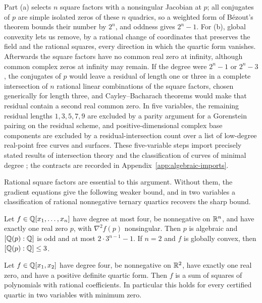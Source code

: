 Part (a) selects $n$ square factors with a nonsingular Jacobian at $p$; all
conjugates of $p$ are simple isolated zeros of these $n$ quadrics, so a
weighted form of B\'ezout's theorem bounds their number by $2^n$, and oddness
gives $2^n-1$. For (b), global convexity lets us remove, by a rational change
of coordinates that preserves the field and the rational squares, every
direction in which the quartic form vanishes. Afterwards the square factors
have no common real zero at infinity, although common complex zeros at
infinity may remain. If the degree were $2^n-1$ or $2^n-3$, the conjugates of
$p$ would leave a residual of length one or three in a complete intersection
of $n$ rational linear combinations of the square factors, chosen generically
for length three, and Cayley--Bacharach theorems
\cite{EisenbudGreenHarris1996} would make that residual contain a second real
common zero. In five variables, the remaining residual
lengths $1,3,5,7,9$ are excluded by a parity argument for a Gorenstein pairing
on the residual scheme, and positive-dimensional complex base components are
excluded by a residual-intersection count over a list of low-degree real-point
free curves and surfaces. These five-variable steps import precisely stated
results of intersection theory \cite{Fulton1998,EklundJostPeterson2013} and
the classification of curves of minimal degree \cite{EisenbudHarris1987}; the
contracts are recorded in Appendix~\ref{app:algebraic-imports}.

Rational square factors are essential to this argument. Without them, the
gradient equations give the following weaker bound, and in two variables a
classification of rational nonnegative ternary quartics recovers the sharp
bound.

\begin{proposition}
\label{prop:algebraic-node-bound}
Let $f\in\mathbb Q[x_1,\ldots,x_n]$ have degree at most four, be nonnegative on
$\mathbb R^n$, and have exactly one real zero $p$, with $\nabla^2f(p)$ nonsingular.
Then $p$ is algebraic and $[\mathbb Q(p):\mathbb Q]$ is odd and at most $2\cdot3^{n-1}-1$.
If $n=2$ and $f$ is globally convex, then $[\mathbb Q(p):\mathbb Q]\le3$.
\end{proposition}

\begin{lemma}
\label{lem:algebraic-bivariate-descent}
Let $f\in\mathbb Q[x_1,x_2]$ have degree four, be nonnegative on $\mathbb R^2$, have exactly
one real zero, and have a positive definite quartic form. Then $f$ is a sum of
squares of polynomials with rational coefficients. In particular this holds
for every certified quartic in two variables with minimum zero.
\end{lemma}

